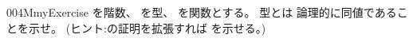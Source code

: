 \documentclass[index]{subfiles}
\begin{document}
\begin{myBlock}{004M}{myExercise}
  を階数、
  を型、
  を関数とする。
  型とは
  論理的に同値であることを示せ。
  (ヒント:の証明を拡張すれば
  を示せる。)
\end{myBlock}
\end{document}
